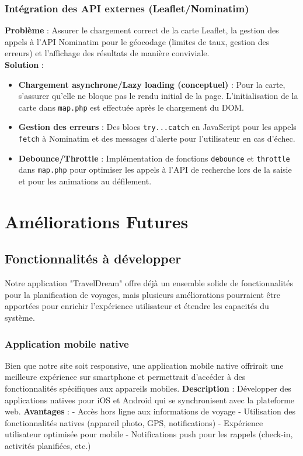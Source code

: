 \documentclass[a4paper,12pt]{article}
\begin{document}
\subsubsection{Intégration des API externes (Leaflet/Nominatim)}
\textbf{Problème} : Assurer le chargement correct de la carte Leaflet, la gestion des appels à l'API Nominatim pour le géocodage (limites de taux, gestion des erreurs) et l'affichage des résultats de manière conviviale. \\
\textbf{Solution} :
\begin{itemize}
    \item \textbf{Chargement asynchrone/Lazy loading (conceptuel)} : Pour la carte, s'assurer qu'elle ne bloque pas le rendu initial de la page. L'initialisation de la carte dans \texttt{map.php} est effectuée après le chargement du DOM.
    \item \textbf{Gestion des erreurs} : Des blocs \texttt{try...catch} en JavaScript pour les appels \texttt{fetch} à Nominatim et des messages d'alerte pour l'utilisateur en cas d'échec.
    \item \textbf{Debounce/Throttle} : Implémentation de fonctions \texttt{debounce} et \texttt{throttle} dans \texttt{map.php} pour optimiser les appels à l'API de recherche lors de la saisie et pour les animations au défilement.
\end{itemize}

\section{Améliorations Futures}

\subsection{Fonctionnalités à développer}
Notre application "TravelDream" offre déjà un ensemble solide de fonctionnalités pour la planification de voyages, mais plusieurs améliorations pourraient être apportées pour enrichir l'expérience utilisateur et étendre les capacités du système.


\subsubsection{Application mobile native}
Bien que notre site soit responsive, une application mobile native offrirait une meilleure expérience sur smartphone et permettrait d'accéder à des fonctionnalités spécifiques aux appareils mobiles.
\textbf {Description} : Développer des applications natives pour iOS et Android qui se synchronisent avec la plateforme web.
\textbf {Avantages }: - Accès hors ligne aux informations de voyage - Utilisation des fonctionnalités natives (appareil photo, GPS, notifications) - Expérience utilisateur optimisée pour mobile - Notifications push pour les rappels (check-in, activités planifiées, etc.)
\end{document}
